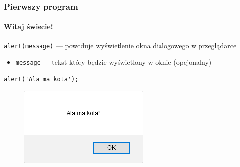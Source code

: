 \begin{frame}[fragile]
  \frametitle{Pierwszy program}
  \framesubtitle{Witaj świecie!}

  \verb|alert(message)| --- powoduje wyświetlenie okna dialogowego w przeglądarce

  \begin{itemize}
    \item \verb|message| --- tekst który będzie wyświetlony w oknie (opcjonalny)
  \end{itemize}

  \begin{verbatim}
alert('Ala ma kota');
  \end{verbatim}


  \begin{figure}
    \includegraphics[scale=0.5]{images/js-alert-example}
  \end{figure}

\end{frame}

